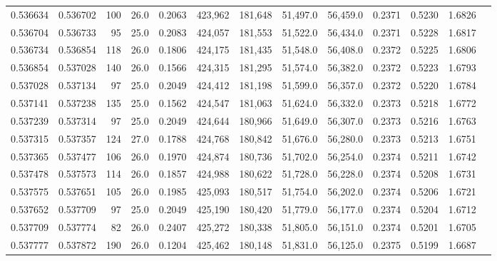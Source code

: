 \begin{tabular}{rrrrrrrrrrrrr}
0.536634 & 0.536702 &   100 & 26.0 &                                     0.2063 & 423,962 & 181,648 &  51,497.0 &  56,459.0 & 0.2371 & 0.5230 & 1.6826 \\
0.536704 & 0.536733 &    95 & 25.0 &                                     0.2083 & 424,057 & 181,553 &  51,522.0 &  56,434.0 & 0.2371 & 0.5228 & 1.6817 \\
0.536734 & 0.536854 &   118 & 26.0 &                                     0.1806 & 424,175 & 181,435 &  51,548.0 &  56,408.0 & 0.2372 & 0.5225 & 1.6806 \\
0.536854 & 0.537028 &   140 & 26.0 &                                     0.1566 & 424,315 & 181,295 &  51,574.0 &  56,382.0 & 0.2372 & 0.5223 & 1.6793 \\
0.537028 & 0.537134 &    97 & 25.0 &                                     0.2049 & 424,412 & 181,198 &  51,599.0 &  56,357.0 & 0.2372 & 0.5220 & 1.6784 \\
0.537141 & 0.537238 &   135 & 25.0 &                                     0.1562 & 424,547 & 181,063 &  51,624.0 &  56,332.0 & 0.2373 & 0.5218 & 1.6772 \\
0.537239 & 0.537314 &    97 & 25.0 &                                     0.2049 & 424,644 & 180,966 &  51,649.0 &  56,307.0 & 0.2373 & 0.5216 & 1.6763 \\
0.537315 & 0.537357 &   124 & 27.0 &                                     0.1788 & 424,768 & 180,842 &  51,676.0 &  56,280.0 & 0.2373 & 0.5213 & 1.6751 \\
0.537365 & 0.537477 &   106 & 26.0 &                                     0.1970 & 424,874 & 180,736 &  51,702.0 &  56,254.0 & 0.2374 & 0.5211 & 1.6742 \\
0.537478 & 0.537573 &   114 & 26.0 &                                     0.1857 & 424,988 & 180,622 &  51,728.0 &  56,228.0 & 0.2374 & 0.5208 & 1.6731 \\
0.537575 & 0.537651 &   105 & 26.0 &                                     0.1985 & 425,093 & 180,517 &  51,754.0 &  56,202.0 & 0.2374 & 0.5206 & 1.6721 \\
0.537652 & 0.537709 &    97 & 25.0 &                                     0.2049 & 425,190 & 180,420 &  51,779.0 &  56,177.0 & 0.2374 & 0.5204 & 1.6712 \\
0.537709 & 0.537774 &    82 & 26.0 &                                     0.2407 & 425,272 & 180,338 &  51,805.0 &  56,151.0 & 0.2374 & 0.5201 & 1.6705 \\
0.537777 & 0.537872 &   190 & 26.0 &                                     0.1204 & 425,462 & 180,148 &  51,831.0 &  56,125.0 & 0.2375 & 0.5199 & 1.6687 \\

\end{tabular}
